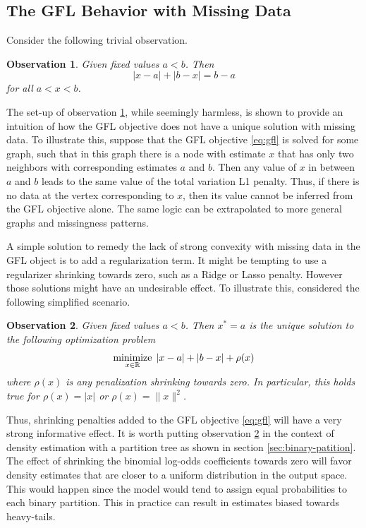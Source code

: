 \documentclass[a4paper, 11pt]{article}
\newtheorem{obs}{Observation}
\begin{document}
\subsection{The GFL Behavior with Missing Data}
\label{subsection:gfl-non-convex}

Consider the following trivial observation.
\begin{obs}\label{obs:non-convex}  Given fixed values $a < b$. Then 
$$|x - a| + |b - x| = b - a$$
for all $a < x < b$. 
\end{obs}
The set-up of observation \ref{obs:non-convex}, while seemingly harmless, is shown to provide an intuition of how the GFL objective does not have a unique solution with missing data. To illustrate this, suppose that the GFL objective \eqref{eq:gfl} is solved for some graph, such that in this graph there is a node with estimate $x$ that has only two neighbors with corresponding estimates $a$ and $b$. Then any value of $x$ in between $a$ and $b$ leads to the same value of the total variation L1 penalty. Thus, if there is no data at the vertex corresponding to $x$, then its value cannot be inferred from the GFL objective alone. The same logic can be extrapolated to more general graphs and missingness patterns. 

A simple solution to remedy the lack of strong convexity with missing data in the GFL object is to add a regularization term. It might be tempting to use a regularizer shrinking towards zero, such as a Ridge or Lasso penalty. However those solutions might have an undesirable effect. To illustrate this, considered the following simplified scenario.
 
 \begin{obs}\label{obs:dont-shrink}
 Given fixed values $a < b$. Then $x^*=a$ is the unique solution to the following optimization problem 
$$
\operatornamewithlimits{minimize}_{x\in\mathbb{R}} \; |x - a| + |b - x| + \rho(x) 
$$
where $\rho(x)$ is any penalization shrinking towards zero. In particular, this holds true for $\rho(x)=\lvert x \rvert$ or $\rho(x)=\lVert x \rVert ^2$.
 \end{obs}
Thus, shrinking penalties added to the GFL objective \eqref{eq:gfl} will have a very strong informative effect. It is worth putting observation \ref{obs:dont-shrink} in the context of density estimation with a partition tree as shown in section \ref{sec:binary-patition}. The effect of shrinking the binomial log-odds coefficients towards zero will favor density estimates that are closer to a uniform distribution in the output space. This would happen since the model would tend to assign equal probabilities to each binary partition. This in practice can result in estimates biased towards heavy-tails. 
\end{document}
